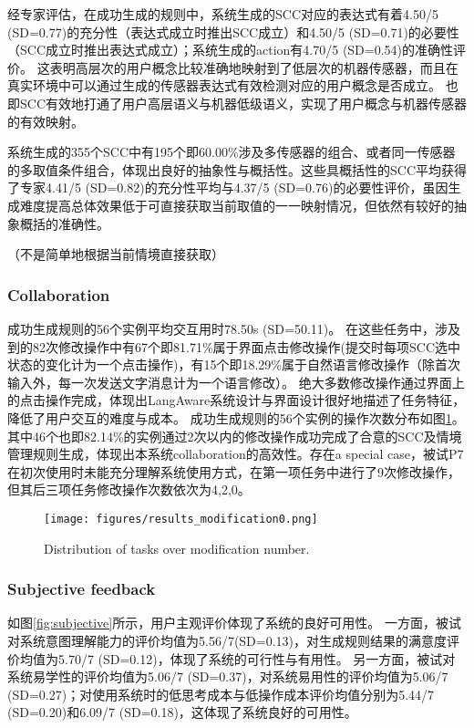     经专家评估，在成功生成的规则中，系统生成的SCC对应的表达式有着4.50/5 (SD=0.77)的充分性（表达式成立时推出SCC成立）和4.50/5 (SD=0.71)的必要性（SCC成立时推出表达式成立）；系统生成的action有4.70/5 (SD=0.54)的准确性评价。
    这表明高层次的用户概念比较准确地映射到了低层次的机器传感器，而且在真实环境中可以通过生成的传感器表达式有效检测对应的用户概念是否成立。
    也即SCC有效地打通了用户高层语义与机器低级语义，实现了用户概念与机器传感器的有效映射。

    系统生成的355个SCC中有195个即60.00\%涉及多传感器的组合、或者同一传感器的多取值条件组合，体现出良好的抽象性与概括性。这些具概括性的SCC平均获得了专家4.41/5 (SD=0.82)的充分性平均与4.37/5 (SD=0.76)的必要性评价，虽因生成难度提高总体效果低于可直接获取当前取值的一一映射情况，但依然有较好的抽象概括的准确性。
    
    （不是简单地根据当前情境直接获取）
\subsubsection{Collaboration}

    成功生成规则的56个实例平均交互用时78.50s (SD=50.11)。
    在这些任务中，涉及到的82次修改操作中有67个即81.71\%属于界面点击修改操作(提交时每项SCC选中状态的变化计为一个点击操作)，有15个即18.29\%属于自然语言修改操作（除首次输入外，每一次发送文字消息计为一个语言修改）。
    绝大多数修改操作通过界面上的点击操作完成，体现出LangAware系统设计与界面设计很好地描述了任务特征，降低了用户交互的难度与成本。
    成功生成规则的56个实例的操作次数分布如图\ref{fig:modification}。其中46个也即82.14\%的实例通过2次以内的修改操作成功完成了合意的SCC及情境管理规则生成，体现出本系统collaboration的高效性。存在a special case，被试P7在初次使用时未能充分理解系统使用方式，在第一项任务中进行了9次修改操作，但其后三项任务修改操作次数依次为4,2,0。
    
     \begin{figure}
        \centering
        \texttt{[image: figures/results\_modification0.png]}
        \caption{Distribution of tasks over modification number.}
        \label{fig:modification}
    \end{figure}   
    
\subsubsection{Subjective feedback}

    如图\ref{fig:subjective}所示，用户主观评价体现了系统的良好可用性。
    一方面，被试对系统意图理解能力的评价均值为5.56/7(SD=0.13)，对生成规则结果的满意度评价均值为5.70/7 (SD=0.12)，体现了系统的可行性与有用性。
    另一方面，被试对系统易学性的评价均值为5.06/7 (SD=0.37)，对系统易用性的评价均值为5.06/7 (SD=0.27)；对使用系统时的低思考成本与低操作成本评价均值分别为5.44/7 (SD=0.20)和6.09/7 (SD=0.18)，这体现了系统良好的可用性。

